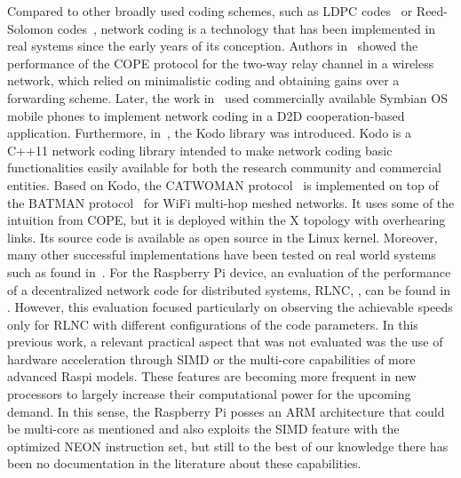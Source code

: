 Compared to other broadly used coding schemes, such as \ac{LDPC}
codes~\cite{gallager1962low} or Reed-Solomon
codes~\cite{reed1960polynomial}, network coding is a technology that
has been implemented in real systems since the early years of its
conception. Authors in~\cite{katti2008xors} showed the
performance of the COPE protocol for the two-way relay channel
in a wireless network, which relied on minimalistic coding and obtaining
gains over a forwarding scheme. Later, the work in~\cite{pedersen2008implementation} used commercially available
Symbian OS mobile phones to implement network coding in a
\ac{D2D} cooperation-based application. Furthermore,
in~\cite{kodo2011pedersen}, the Kodo library was introduced. Kodo is
a C++11 network coding library intended to make network coding
basic functionalities easily available for both the research community
and commercial entities. Based on Kodo, the CATWOMAN
protocol~\cite{hundeboll2012catwoman} is implemented on top of the
BATMAN protocol~\cite{johnson2008simple} for WiFi multi-hop meshed
networks. It uses some of the intuition from COPE, but it is deployed
within the X topology with overhearing links. Its source code is available
as open source in the Linux kernel. Moreover, many other successful
implementations have been tested on real world systems such as
found in~\cite{pahlevani2013playncool,krigslund2013core,
paramanathan2013leanandmean,seferoglu2011i2nc}. For the Raspberry Pi device, an evaluation
of the performance of a decentralized network code for distributed systems, \ac{RLNC},
\cite{ho2006random}, can be found in \cite{paramanathan2014sharing}.
However, this evaluation focused particularly on observing the achievable
speeds only for \ac{RLNC} with different configurations of
the code parameters. In this previous work, a relevant practical aspect that
was not evaluated was the use of hardware acceleration through \ac{SIMD} or
the multi-core capabilities of more advanced \ac{Raspi} models. These features are
becoming more frequent in new processors to largely increase their computational
power for the upcoming demand. In this sense, the Raspberry Pi posses an \ac{ARM}
architecture that could be multi-core as mentioned and also exploits the \ac{SIMD}
feature with the optimized NEON instruction set, but still to the best of our knowledge
there has been no documentation in the literature about these capabilities.

